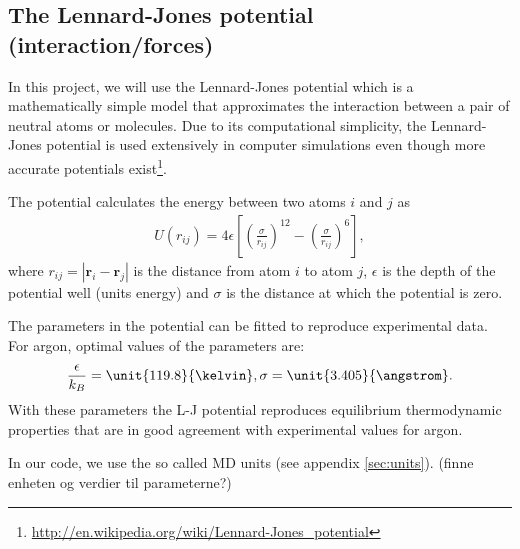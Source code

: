 \documentclass[11pt,a4wide]{article}
\renewcommand{\vec}{\mathbf}
\begin{document}
\subsection{The Lennard-Jones potential (interaction/forces)} \label{sec: L-Jpot_forces}

In this project, we will use the Lennard-Jones potential which is a mathematically simple model that approximates the interaction between a pair of neutral atoms or molecules. Due to its computational simplicity, the Lennard-Jones potential is used extensively in computer simulations even though more accurate potentials exist\footnote{\url{http://en.wikipedia.org/wiki/Lennard-Jones_potential}}.

The potential calculates the energy between two atoms $i$ and $j$ as
\begin{align}
	U(r_{ij}) = 4\epsilon\left[\left(\frac{\sigma}{r_{ij}}\right)^{12} - \left(\frac{\sigma}{r_{ij}}\right)^6\right],
\end{align}
where $r_{ij} = |\vec r_i - \vec r_j|$ is the distance from atom $i$ to atom $j$, $\epsilon$ is the depth of the potential well (units energy) and $\sigma$ is the distance at which the potential is zero. 

The parameters in the potential can be fitted to reproduce experimental data. For argon, optimal values of the parameters are:
\begin{align}
	\frac{\epsilon}{k_B} = \unit{119.8}{\kelvin}, \sigma=\unit{3.405}{\angstrom}.
\end{align}
With these parameters the L-J potential reproduces equilibrium thermodynamic properties that are in good agreement with experimental values for argon.

In our code, we use the so called MD units (see appendix \ref{sec:units}). (finne enheten og verdier til parameterne?)

\end{document}

